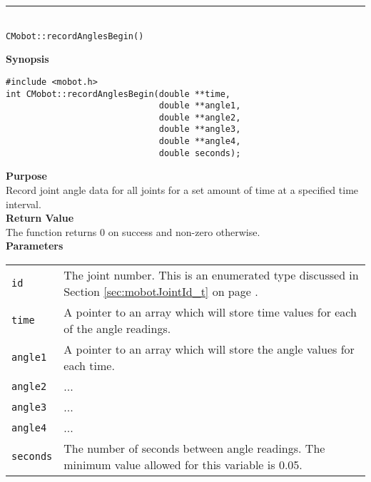 \noindent
\vspace{5pt}
\rule{4.5in}{0.015in}\\
\noindent
{\LARGE \texttt{CMobot::recordAnglesBegin()}}\\
{}

\noindent
{\bf Synopsis}
\vspace{-8pt}
\begin{verbatim}
#include <mobot.h>
int CMobot::recordAnglesBegin(double **time, 
                              double **angle1, 
                              double **angle2, 
                              double **angle3, 
                              double **angle4, 
                              double seconds);
\end{verbatim}

\noindent
{\bf Purpose}\\
Record joint angle data for all joints for a set amount of time at a specified time interval.\\

\noindent
{\bf Return Value}\\
The function returns 0 on success and non-zero otherwise.\\

\noindent
{\bf Parameters}\\
\vspace{-0.1in}
\begin{description}
\item               
\begin{tabular}{p{15 mm}p{145 mm}}
\texttt{id} & The joint number. This is an enumerated type 
discussed in Section \ref{sec:mobotJointId_t} on page
\pageref{sec:mobotJointId_t}.\\
\texttt{time} & A pointer to an array which will store time values for each of the angle readings. \\
\texttt{angle1} & A pointer to an array which will store the angle values for each time. \\
\texttt{angle2} & ... \\
\texttt{angle3} & ... \\
\texttt{angle4} & ... \\
\texttt{seconds} & The number of seconds between angle readings. The minimum value allowed for
this variable is 0.05.
\end{tabular}
\end{description}


